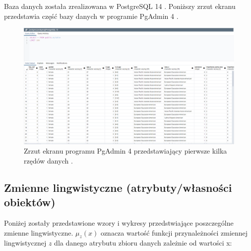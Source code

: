 \documentclass{classrep}
\begin{document}
Baza danych została zrealizowana w PostgreSQL 14 \cite{postgres}. Poniższy zrzut ekranu przedstawia część bazy danych w programie PgAdmin 4 \cite{pgadmin}.
\begin{figure}[H]
\centering
\includegraphics[scale=0.2]{bazadanych.png}
\caption{Zrzut ekranu programu PgAdmin 4 przedstawiający pierwsze kilka rzędów danych \cite{database}.} 
\end{figure}





\subsection{Zmienne lingwistyczne (atrybuty/własności obiektów)}

Poniżej zostały przedstawione wzory i wykresy przedstwiające poszczególne zmienne lingwistyczne. \( \mu_z(x) \) oznacza wartość funkcji przynależności zmiennej lingwistycznej \(z\) dla danego atrybutu zbioru danych zależnie od wartości x:
\end{document}
